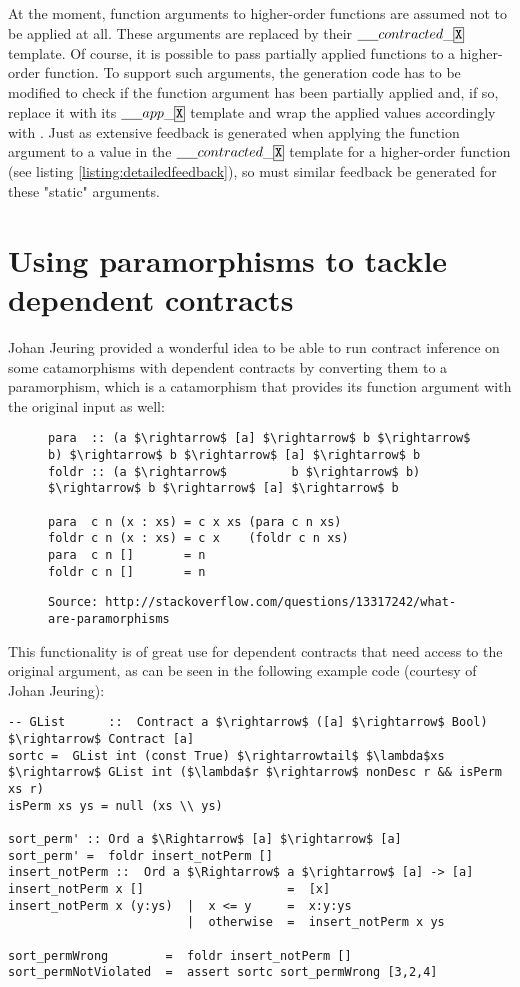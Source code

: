 \documentclass[10pt]{report}
\newcommand{\ctrttemplate}{\underline{\hspace{1.5em}}contracted\_\code{X}}
\newcommand{\apptemplate}{\underline{\hspace{1.5em}}app\_\code{X}}
\newcommand{\code}[1]{%
  {%
   \setlength{\fboxsep}{-2\fboxrule}%
   \fcolorbox{black}{light-gray}{\hspace{1.5pt}\strut\texttt{#1}\hspace{1.5pt}}%
  }%
}
\begin{document}
At the moment, function arguments to higher-order functions are assumed not to be applied at all.
These arguments are replaced by their $\ctrttemplate$ template.
Of course, it is possible to pass partially applied functions to a higher-order function.
To support such arguments, the generation code has to be modified to check if the function argument has been partially applied and, if so, replace it with its $\apptemplate$ template and wrap the applied values accordingly with \code{appParam}.
Just as extensive feedback is generated when applying the function argument to a value in the $\ctrttemplate$ template for a higher-order function (see listing \ref{listing:detailedfeedback}), so must similar feedback be generated for these "static" arguments.

\section{Using paramorphisms to tackle dependent contracts}

Johan Jeuring provided a wonderful idea to be able to run contract inference on some catamorphisms with dependent contracts by converting them to a paramorphism, which is a catamorphism that provides its function argument with the original input as well:

\begin{figure}[htps]
\begin{lstlisting}[mathescape]
para  :: (a $\rightarrow$ [a] $\rightarrow$ b $\rightarrow$ b) $\rightarrow$ b $\rightarrow$ [a] $\rightarrow$ b
foldr :: (a $\rightarrow$         b $\rightarrow$ b) $\rightarrow$ b $\rightarrow$ [a] $\rightarrow$ b

para  c n (x : xs) = c x xs (para c n xs)
foldr c n (x : xs) = c x    (foldr c n xs)
para  c n []       = n
foldr c n []       = n
\end{lstlisting}
\texttt{\scriptsize{Source: http://stackoverflow.com/questions/13317242/what-are-paramorphisms}}
\end{figure}

This functionality is of great use for dependent contracts that need access to the original argument, as can be seen in the following example code (courtesy of Johan Jeuring):

\begin{lstlisting}[mathescape]
-- GList      ::  Contract a $\rightarrow$ ([a] $\rightarrow$ Bool) $\rightarrow$ Contract [a]
sortc =  GList int (const True) $\rightarrowtail$ $\lambda$xs $\rightarrow$ GList int ($\lambda$r $\rightarrow$ nonDesc r && isPerm xs r)
isPerm xs ys = null (xs \\ ys)

sort_perm' :: Ord a $\Rightarrow$ [a] $\rightarrow$ [a]
sort_perm' =  foldr insert_notPerm []
insert_notPerm ::  Ord a $\Rightarrow$ a $\rightarrow$ [a] -> [a]
insert_notPerm x []                    =  [x]
insert_notPerm x (y:ys)  |  x <= y     =  x:y:ys
                         |  otherwise  =  insert_notPerm x ys
                         
sort_permWrong        =  foldr insert_notPerm [] 
sort_permNotViolated  =  assert sortc sort_permWrong [3,2,4]
\end{lstlisting}
\end{document}

